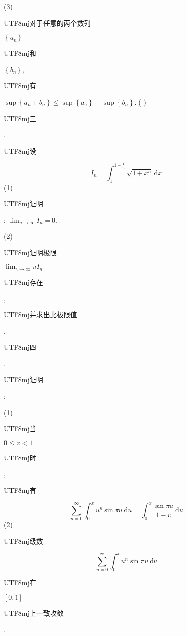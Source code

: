 \documentclass[10pt]{article}
\begin{document}
(3) \begin{CJK}{UTF8}{mj}对于任意的两个数列\end{CJK} $\left\{a_{n}\right\}$ \begin{CJK}{UTF8}{mj}和\end{CJK} $\left\{b_{n}\right\}$, \begin{CJK}{UTF8}{mj}有\end{CJK} $\sup \left\{a_{n}+b_{n}\right\} \leqslant \sup \left\{a_{n}\right\}+\sup \left\{b_{n}\right\}$. ( )

\begin{CJK}{UTF8}{mj}三\end{CJK}. \begin{CJK}{UTF8}{mj}设\end{CJK}
$$
I_{n}=\int_{1}^{1+\frac{1}{n}} \sqrt{1+x^{n}} \mathrm{~d} x
$$
(1) \begin{CJK}{UTF8}{mj}证明\end{CJK}: $\lim _{n \rightarrow \infty} I_{n}=0$.

(2) \begin{CJK}{UTF8}{mj}证明极限\end{CJK} $\lim _{n \rightarrow \infty} n I_{n}$ \begin{CJK}{UTF8}{mj}存在\end{CJK}, \begin{CJK}{UTF8}{mj}并求出此极限值\end{CJK}.

\begin{CJK}{UTF8}{mj}四\end{CJK}. \begin{CJK}{UTF8}{mj}证明\end{CJK}:

(1) \begin{CJK}{UTF8}{mj}当\end{CJK} $0 \leqslant x<1$ \begin{CJK}{UTF8}{mj}时\end{CJK}, \begin{CJK}{UTF8}{mj}有\end{CJK}
$$
\sum_{n=0}^{\infty} \int_{0}^{x} u^{n} \sin \pi u \mathrm{~d} u=\int_{0}^{x} \frac{\sin \pi u}{1-u} \mathrm{~d} u
$$
(2) \begin{CJK}{UTF8}{mj}级数\end{CJK}
$$
\sum_{n=0}^{\infty} \int_{0}^{x} u^{n} \sin \pi u \mathrm{~d} u
$$
\begin{CJK}{UTF8}{mj}在\end{CJK} $[0,1]$ \begin{CJK}{UTF8}{mj}上一致收敛\end{CJK}.
\end{document}
